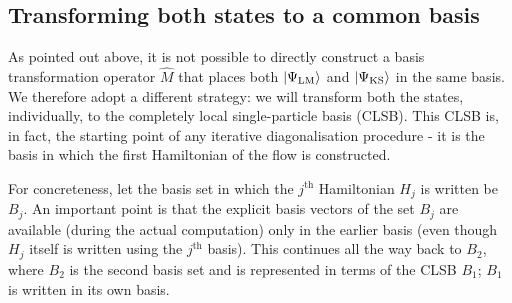\documentclass[reprint]{revtex4-2}
\begin{document}
\subsection{Transforming both states to a common basis}
As pointed out above, it is not possible to directly construct a basis transformation operator \(\hat M\) that places both \(\ket{\Psi_\text{LM}}\) and \(\ket{\Psi_\text{KS}}\)  in the same basis. We therefore adopt a different strategy: we will transform both the states, individually, to the completely local single-particle basis (CLSB). This CLSB is, in fact, the starting point of any iterative diagonalisation procedure - it is the basis in which the first Hamiltonian of the flow is constructed. 

For concreteness, let the basis set in which the \(j^\text{th}\) Hamiltonian \(H_j\) is written be \(B_j\). An important point is that the explicit basis vectors of the set \(B_j\) are available (during the actual computation) only in the earlier basis (even though \(H_j\) itself is written using the \(j^\text{th}\) basis). This continues all the way back to \(B_2\), where \(B_2\) is the second basis set and is represented in terms of the CLSB \(B_1\); \(B_1\) is written in its own basis.
\end{document}
